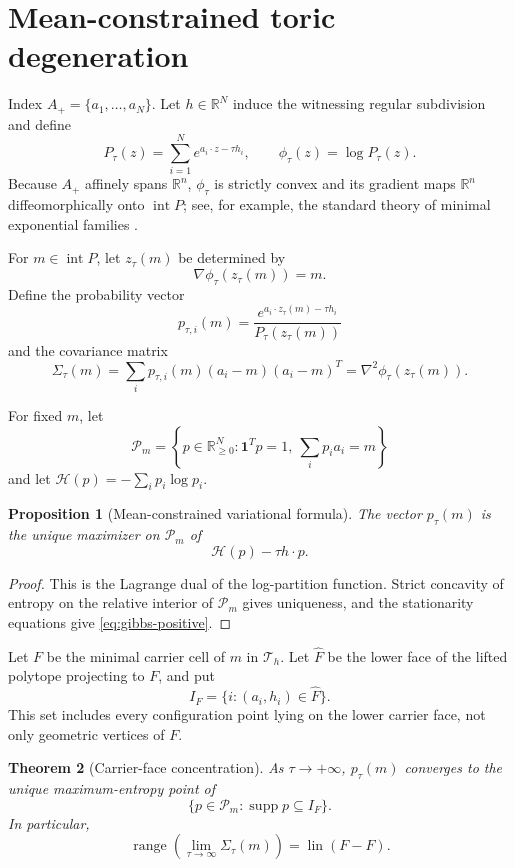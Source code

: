 \documentclass[11pt]{article}
\theoremstyle{plain}
\newtheorem{theorem}{Theorem}[section]
\newtheorem{proposition}[theorem]{Proposition}
\theoremstyle{definition}
\theoremstyle{remark}
\newcommand{\R}{\mathbb R}
\newcommand{\lin}{\operatorname{lin}}
\newcommand{\supp}{\operatorname{supp}}
\newcommand{\one}{\mathbf 1}
\begin{document}
\section{Mean-constrained toric degeneration}

Index $A_+=\{a_1,\ldots,a_N\}$. Let $h\in\R^N$ induce the witnessing regular subdivision and define
\begin{equation}\label{eq:partition}
 P_\tau(z)=\sum_{i=1}^N e^{a_i\cdot z-\tau h_i},
 \qquad
 \phi_\tau(z)=\log P_\tau(z).
\end{equation}
Because $A_+$ affinely spans $\R^n$, $\phi_\tau$ is strictly convex and its gradient maps $\R^n$ diffeomorphically onto $\operatorname{int}P$; see, for example, the standard theory of minimal exponential families \cite{WainwrightJordan}.

For $m\in\operatorname{int}P$, let $z_\tau(m)$ be determined by
\[
 \nabla\phi_\tau(z_\tau(m))=m.
\]
Define the probability vector
\begin{equation}\label{eq:gibbs-positive}
 p_{\tau,i}(m)=
 \frac{e^{a_i\cdot z_\tau(m)-\tau h_i}}{P_\tau(z_\tau(m))}
\end{equation}
and the covariance matrix
\[
 \Sigma_\tau(m)=\sum_i p_{\tau,i}(m)(a_i-m)(a_i-m)^T
 =\nabla^2\phi_\tau(z_\tau(m)).
\]

For fixed $m$, let
\[
 \mathcal P_m=
 \left\{p\in\R_{\ge0}^N:
 \one^Tp=1,\ \sum_ip_ia_i=m\right\}
\]
and let $\mathcal H(p)=-\sum_ip_i\log p_i$.

\begin{proposition}[Mean-constrained variational formula]\label{prop:mean-variational}
The vector $p_\tau(m)$ is the unique maximizer on $\mathcal P_m$ of
\[
 \mathcal H(p)-\tau h\cdot p.
\]
\end{proposition}

\begin{proof}
This is the Lagrange dual of the log-partition function. Strict concavity of entropy on the relative interior of $\mathcal P_m$ gives uniqueness, and the stationarity equations give \eqref{eq:gibbs-positive}.
\end{proof}

Let $F$ be the minimal carrier cell of $m$ in $\mathcal T_h$. Let $\widehat F$ be the lower face of the lifted polytope projecting to $F$, and put
\[
 I_F=\{i:(a_i,h_i)\in\widehat F\}.
\]
This set includes every configuration point lying on the lower carrier face, not only geometric vertices of $F$.

\begin{theorem}[Carrier-face concentration]\label{thm:concentration}
As $\tau\to+\infty$, $p_\tau(m)$ converges to the unique maximum-entropy point of
\[
 \{p\in\mathcal P_m:\supp p\subseteq I_F\}.
\]
In particular,
\[
 \operatorname{range}\left(\lim_{\tau\to\infty}\Sigma_\tau(m)\right)
 =\lin(F-F).
\]
\end{theorem}
\end{document}
